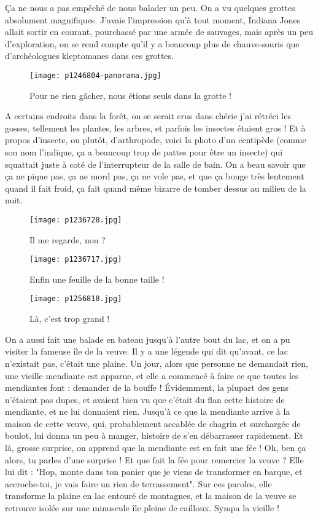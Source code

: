 \documentclass{book}
\begin{document}
Ça ne nous a pas empêché de nous balader un peu. On a vu quelques grottes absolument magnifiques. J'avais l'impression qu'à tout moment, Indiana Jones allait sortir en courant, pourchassé par une armée de sauvages, mais après un peu d'exploration, on se rend compte qu'il y a beaucoup plus de chauve-souris que d'archéologues kleptomanes dans ces grottes.


\begin{figure}[h]
\centering
\texttt{[image: p1246804-panorama.jpg]}
\caption*{Pour ne rien gâcher, nous étions seuls dans la grotte !}
\end{figure}

A certains endroits dans la forêt, on se serait crus dans chérie j'ai rétréci les gosses, tellement les plantes, les arbres, et parfois les insectes étaient gros ! Et à propos d'insecte, ou plutôt, d'arthropode, voici la photo d'un centipède (comme son nom l'indique, ça a beaucoup trop de pattes pour être un insecte) qui squattait juste à coté de l'interrupteur de la salle de bain. On a beau savoir que ça ne pique pas, ça ne mord pas, ça ne vole pas, et que ça bouge très lentement quand il fait froid, ça fait quand même bizarre de tomber dessus au milieu de la nuit.


\begin{figure}[h]
\centering
\texttt{[image: p1236728.jpg]}
\caption*{Il me regarde, non ?}
\end{figure}


\begin{figure}[h]
\centering
\texttt{[image: p1236717.jpg]}
\caption*{Enfin une feuille de la bonne taille !}
\end{figure}


\begin{figure}[h]
\centering
\texttt{[image: p1256818.jpg]}
\caption*{Là, c'est trop grand !}
\end{figure}

On a aussi fait une balade en bateau jusqu'à l'autre bout du lac, et on a pu visiter la fameuse île de la veuve. Il y a une légende qui dit qu'avant, ce lac n'existait pas, c'était une plaine. Un jour, alors que personne ne demandait rien, une vieille mendiante est apparue, et elle a commencé à faire ce que toutes les mendiantes font : demander de la bouffe ! Évidemment, la plupart des gens n'étaient pas dupes, et avaient bien vu que c'était du flan cette histoire de mendiante, et ne lui donnaient rien. Jusqu'à ce que la mendiante arrive à la maison de cette veuve, qui, probablement accablée de chagrin et surchargée de boulot, lui donna un peu à manger, histoire de s'en débarrasser rapidement. Et là, grosse surprise, on apprend que la mendiante est en fait une fée ! Oh, ben ça alors, tu parles d'une surprise ! Et que fait la fée pour remercier la veuve ? Elle lui dit : "Hop, monte dans ton panier que je viens de transformer en barque, et accroche-toi, je vais faire un rien de terrassement". Sur ces paroles, elle transforme la plaine en lac entouré de montagnes, et la maison de la veuve se retrouve isolée sur une minuscule île pleine de cailloux. Sympa la vieille !
\end{document}
